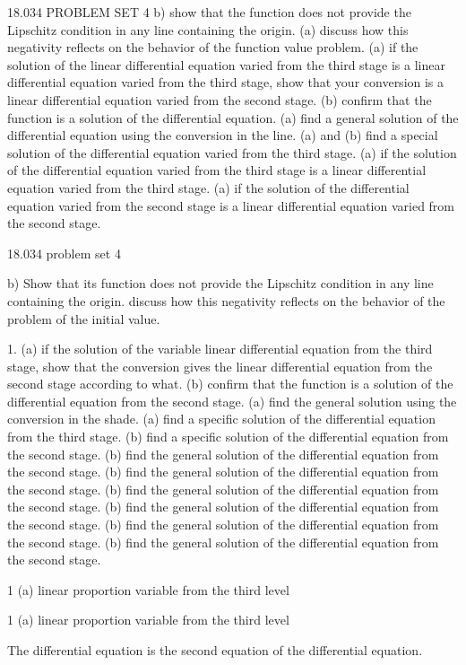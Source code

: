 \documentclass[12pt]{article}
\begin{document}
18.034 PROBLEM SET 4 b) show that the function does not provide the Lipschitz condition in any line containing the origin. (a) discuss how this negativity reflects on the behavior of the function value problem. (a) if the solution of the linear differential equation varied from the third stage is a linear differential equation varied from the third stage, show that your conversion is a linear differential equation varied from the second stage. (b) confirm that the function is a solution of the differential equation. (a) find a general solution of the differential equation using the conversion in the line. (a) and (b) find a special solution of the differential equation varied from the third stage. (a) if the solution of the differential equation varied from the third stage is a linear differential equation varied from the third stage. (a) if the solution of the differential equation varied from the second stage is a linear differential equation varied from the second stage.

18.034 problem set 4

b) Show that its function does not provide the Lipschitz condition in any line containing the origin. discuss how this negativity reflects on the behavior of the problem of the initial value.

1. (a) if the solution of the variable linear differential equation from the third stage, show that the conversion gives the linear differential equation from the second stage according to what. (b) confirm that the function is a solution of the differential equation from the second stage. (a) find the general solution using the conversion in the shade. (a) find a specific solution of the differential equation from the third stage. (b) find a specific solution of the differential equation from the second stage. (b) find the general solution of the differential equation from the second stage. (b) find the general solution of the differential equation from the second stage. (b) find the general solution of the differential equation from the second stage. (b) find the general solution of the differential equation from the second stage. (b) find the general solution of the differential equation from the second stage. (b) find the general solution of the differential equation from the second stage.

1 (a) linear proportion variable from the third level

1 (a) linear proportion variable from the third level

The differential equation is the second equation of the differential equation.
\end{document}
